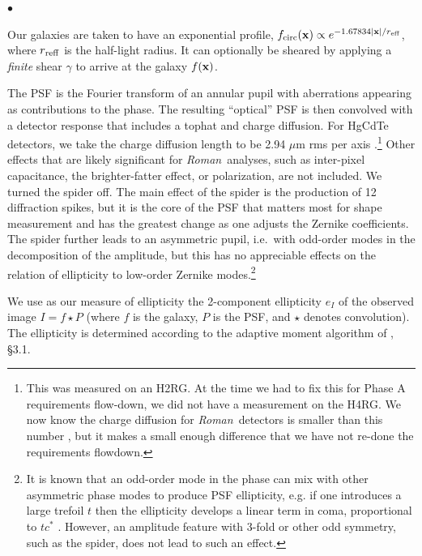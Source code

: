 \documentclass[usenatbib]{mnras}
\newcommand{\wfirst}{{\slshape Roman}}
\newcommand{\changetext}[1]{\textcolor{brown}{#1}}
\begin{document}
\begin{list}{$\bullet$}{}
\item Our galaxies are taken to have an exponential profile, $f_{\rm circ}({\bf x}) \propto e^{-1.67834|{\bf x}|/r_{\rm eff}}$, where $r_{\rm reff}$ is the half-light radius. It can optionally be sheared by applying a {\em finite} shear $\gamma$ to arrive at the galaxy $f({\bf x})$.
\item The PSF is the Fourier transform of an
annular pupil with aberrations appearing as contributions to the
phase. The resulting ``optical'' PSF is then convolved with a detector
response that includes a tophat and charge diffusion. For HgCdTe
detectors, we take the charge diffusion length to be 2.94 $\mu$m rms
per axis \citep{2007PASP..119..466B}.\footnote{This was measured on an H2RG. At the time we had to fix this for Phase A requirements
flow-down, we did not have a measurement on the H4RG. We now know the charge diffusion for \wfirst\ detectors is smaller than this number \changetext{\citep{2020arXiv200500505M}}, but it makes a small enough difference that we have not re-done the requirements flowdown.} Other effects that are likely significant for \wfirst\ analyses, such as inter-pixel capacitance, the brighter-fatter effect, or polarization, are not included. We turned the spider off. The main effect of the spider is the production of 12 diffraction spikes, but it is the core of the PSF that matters most for shape measurement and has the greatest change as one adjusts the Zernike coefficients. The spider further leads to an asymmetric pupil, i.e.\ with odd-order modes in the decomposition of the amplitude, but this has no appreciable effects on the relation of ellipticity to low-order Zernike modes.\footnote{It is known that an odd-order mode in the phase can
mix with other asymmetric phase modes to produce PSF ellipticity,
e.g. if one introduces a large trefoil $t$ then the ellipticity
develops a linear term in coma, proportional to $tc^\ast$
\citep{2010SPIE.7731E..1EN}. However, an amplitude feature with 3-fold
or other odd symmetry, such as the spider, does not lead to such an
effect.}
\item We use as our measure of ellipticity the 2-component ellipticity $e_I$ of the observed image $I = f \star P$ (where $f$ is the galaxy, $P$ is the PSF, and $\star$ denotes convolution). The ellipticity is determined according to the adaptive moment algorithm of \cite{2002AJ....123..583B}, \S3.1.
\end{list}
\end{document}
